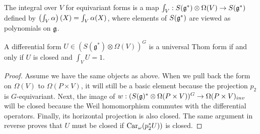 The integral over $V$ for equivariant forms
is a map  $\int_V : S(\operatorname{\mathfrak{g}}^*)\otimes \Omega(V) \to S(\operatorname{\mathfrak{g}}^*)$ defined by 
$\paren{\int_V \alpha}(X) = \int_V \alpha(X)$, where elements of $S(\operatorname{\mathfrak{g}}^*)$ are 
viewed as  polynomials on $\operatorname{\mathfrak{g}}$. 

\begin{thm} 
	A differential form $U\in (S(\mathfrak{g}^*)\otimes \Omega(V))^G$ is a 
	universal Thom form if and only if $U$ is closed and  $\int_V U = 1$.
\end{thm}
\begin{proof}
	Assume we have the same objects as above.
	When we pull back the form on $\Omega(V)$ to $\Omega(P\times V)$, it
	will still be a basic element because the projection $p_2$ is 
	$G$-equivariant. Next, the image of    
	$w:(S(\operatorname{\mathfrak{g}})^*\otimes \Omega(P\times V))^G \to \Omega(P\times V)_{inv}$ 
	will be closed because the Weil homomorphism
	commutes with the differential operators. Finally, its horizontal
	projection is also closed. The same argument
	in reverse proves that $U$ must be closed if  $\operatorname{Car}_\omega(p_2^*U))$ is
	closed.


\end{proof}

